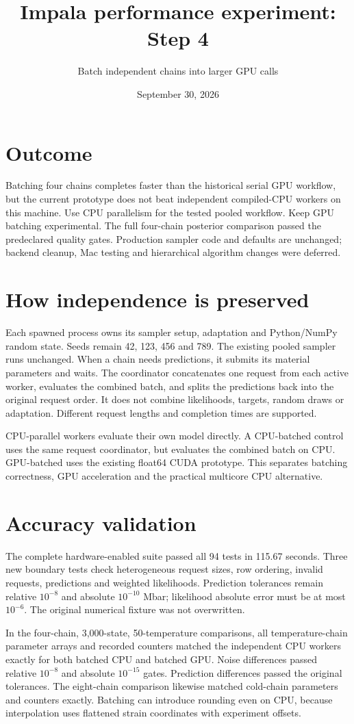 \documentclass[11pt]{article}
\title{Impala performance experiment: Step 4}
\author{Batch independent chains into larger GPU calls}
\date{September 30, 2026}
\begin{document}
\maketitle
\section*{Outcome}
Batching four chains completes faster than the historical serial GPU workflow,
but the current prototype does not beat independent compiled-CPU workers on
this machine. Use CPU parallelism for the tested pooled workflow. Keep GPU
batching experimental. The full four-chain posterior comparison passed
the predeclared quality gates. Production sampler code and defaults are unchanged;
backend cleanup, Mac testing and hierarchical algorithm changes were deferred.
\section*{How independence is preserved}
Each spawned process owns its sampler setup, adaptation and Python/NumPy random
state. Seeds remain 42, 123, 456 and 789. The existing pooled sampler runs
unchanged. When a chain needs predictions, it submits its material parameters
and waits. The coordinator concatenates one request from each active worker,
evaluates the combined batch, and splits the predictions back into the original
request order. It does not combine likelihoods, targets, random draws or
adaptation. Different request lengths and completion times are supported.

CPU-parallel workers evaluate their own model directly. A CPU-batched control
uses the same request coordinator, but evaluates the combined batch on CPU.
GPU-batched uses the existing float64 CUDA prototype. This separates batching
correctness, GPU acceleration and the practical multicore CPU alternative.
\section*{Accuracy validation}
The complete hardware-enabled suite passed all 94 tests in 115.67 seconds.
Three new boundary tests check heterogeneous request sizes, row ordering,
invalid requests, predictions and weighted likelihoods. Prediction tolerances
remain relative $10^{-8}$ and absolute $10^{-10}$ Mbar; likelihood absolute error
must be at most $10^{-6}$. The original numerical fixture was not overwritten.

In the four-chain, 3,000-state, 50-temperature comparisons, all temperature-chain
parameter arrays and recorded counters matched the independent CPU workers
exactly for both batched CPU and batched GPU. Noise differences passed relative
$10^{-8}$ and absolute $10^{-15}$ gates. Prediction differences passed the
original tolerances. The eight-chain comparison likewise matched cold-chain
parameters and counters exactly. Batching can introduce rounding even on CPU,
because interpolation uses flattened strain coordinates with experiment offsets.
\end{document}
